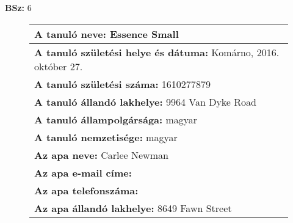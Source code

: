 \documentclass[10pt,a4paper]{article}
\begin{document}
    \vfill
    \textbf{BSz: }6
\newpage
    \begin{figure}[!ht]
    \begin{tabular}{|m{\textwidth}|}
    \hline \vspace{3pt}
    \textbf{A tanuló neve:} \hspace{0.5cm} Essence Small \vspace{3pt} \\
\hline\vspace{3pt}
\textbf{A tanuló születési helye és dátuma:} \hspace{0.5cm} Komárno, 2016.  október 27. \vspace{3pt} \\
\hline\vspace{3pt}
\textbf{A tanuló születési száma:} \hspace{0.5cm} 1610277879 \vspace{3pt} \\
\hline\vspace{3pt}
\textbf{A tanuló állandó lakhelye:} \hspace{0.5cm} 9964 Van Dyke Road \vspace{3pt} \\
\hline\vspace{3pt}
\textbf{A tanuló állampolgársága:} \hspace{0.5cm} magyar \vspace{3pt} \\
\hline\vspace{3pt}
\textbf{A tanuló nemzetisége:} \hspace{0.5cm} magyar \vspace{3pt} \\
\hline\vspace{3pt}
\textbf{Az apa neve:} \hspace{0.5cm} Carlee Newman \vspace{3pt} \\
\hline\vspace{3pt}
\textbf{Az apa e-mail címe:} \hspace{0.5cm}  \vspace{3pt} \\
\hline\vspace{3pt}
\textbf{Az apa telefonszáma:} \hspace{0.5cm}  \vspace{3pt} \\
\hline\vspace{3pt}
\textbf{Az apa állandó lakhelye:} \hspace{0.5cm} 8649 Fawn Street \vspace{3pt} \\

\end{tabular}
\end{figure}
\end{document}
